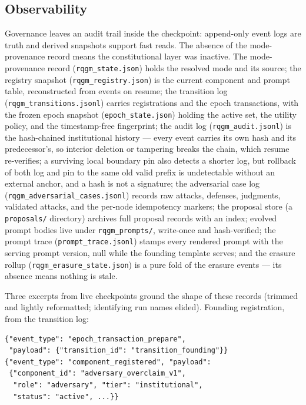 \subsection{Observability}\label{sec:rqgm:observability}

Governance leaves an audit trail inside the checkpoint: append-only event
logs are truth and derived snapshots support fast reads. The absence of
the mode-provenance record means the constitutional layer was inactive.
The mode-provenance record
(\texttt{rqgm\_state.json}) holds the resolved mode and its source;
the registry snapshot (\texttt{rqgm\_registry.json}) is the current
component and prompt table, reconstructed from events on resume; the
transition log (\texttt{rqgm\_transitions.jsonl}) carries
registrations and the epoch transactions, with the frozen epoch
snapshot (\texttt{epoch\_state.json}) holding the active set, the
utility policy, and the timestamp-free fingerprint; the audit log
(\texttt{rqgm\_audit.jsonl}) is the hash-chained institutional
history --- every event carries its own hash and its predecessor's,
so interior deletion or tampering breaks the chain, which resume
re-verifies; a surviving local boundary pin also detects a shorter log,
but rollback of both log and pin to the same old valid prefix is
undetectable without an external anchor, and a hash is not a signature;
the adversarial case log (\texttt{rqgm\_adversarial\_cases.jsonl})
records raw attacks, defenses, judgments, validated attacks, and the
per-node idempotency markers; the proposal store (a
\texttt{proposals/} directory) archives full proposal records with an
index; evolved prompt bodies live under \texttt{rqgm\_prompts/},
write-once and hash-verified; the prompt trace
(\texttt{prompt\_trace.jsonl}) stamps every rendered prompt with the
serving prompt version, null while the founding template serves; and
the erasure rollup (\texttt{rqgm\_erasure\_state.json}) is a pure
fold of the erasure events --- its absence means nothing is stale.

Three excerpts from live checkpoints ground the shape of these
records (trimmed and lightly reformatted; identifying run names
elided). Founding registration, from the transition log:

\begin{Verbatim}[breaklines, fontsize=\scriptsize]
{"event_type": "epoch_transaction_prepare",
 "payload": {"transition_id": "transition_founding"}}
{"event_type": "component_registered", "payload":
 {"component_id": "adversary_overclaim_v1",
  "role": "adversary", "tier": "institutional",
  "status": "active", ...}}
\end{Verbatim}

